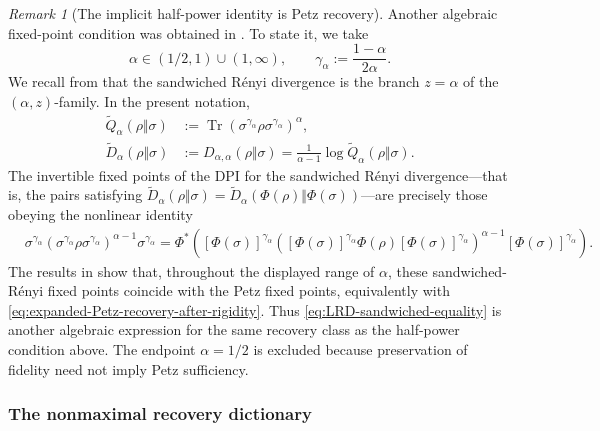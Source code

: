 \documentclass[11pt]{article}
\theoremstyle{remark}
\newtheorem{remark}[remark]{Remark}
\newcommand{\1}{\mathbbm{1}}
\begin{document}
\begin{remark}[The implicit half-power identity is Petz recovery]
Another algebraic fixed-point condition was obtained in
\cite[Theorem~1 and Eq.~(30)]{leditzky2017data}.  To state it, we take
\begin{equation}
 \alpha\in(1/2,1)\cup(1,\infty),
 \qquad
 \gamma_\alpha:=\frac{1-\alpha}{2\alpha}.
\end{equation}
We recall from  that the sandwiched
R\'enyi divergence is the branch $z=\alpha$ of the
$(\alpha,z)$-family.  In the present notation,
\begin{align}
 \widetilde Q_\alpha(\rho\Vert\sigma)
 &:=\operatorname{Tr}\!\left(
   \sigma^{\gamma_\alpha}\rho\sigma^{\gamma_\alpha}
   \right)^\alpha,
 \label{eq:sandwiched-Q-recall}\\
 \widetilde D_\alpha(\rho\Vert\sigma)
 &:=D_{\alpha,\alpha}(\rho\Vert\sigma)
 =\frac{1}{\alpha-1}
   \log\widetilde Q_\alpha(\rho\Vert\sigma).
 \label{eq:sandwiched-divergence-recall}
\end{align}
The invertible fixed points of the DPI for the sandwiched R\'enyi
divergence---that is, the pairs satisfying
$\widetilde D_\alpha(\rho\Vert\sigma)
=\widetilde D_\alpha(\Phi(\rho)\Vert\Phi(\sigma))$---are precisely
those obeying the nonlinear identity
\begin{equation}
\begin{aligned}
 &\sigma^{\gamma_\alpha}
  \left(\sigma^{\gamma_\alpha}\rho
              \sigma^{\gamma_\alpha}\right)^{\alpha-1}
  \sigma^{\gamma_\alpha}=\Phi^*\!\left(
 [\Phi(\sigma)]^{\gamma_\alpha}
 \left(
 [\Phi(\sigma)]^{\gamma_\alpha}\Phi(\rho)
 [\Phi(\sigma)]^{\gamma_\alpha}
 \right)^{\alpha-1}
 [\Phi(\sigma)]^{\gamma_\alpha}
 \right).
 \label{eq:LRD-sandwiched-equality}
\end{aligned}
\end{equation}
The results in
\cite{jencova2017preservation,jencova2021renyi} show that, throughout
the displayed range of $\alpha$, these sandwiched-R\'enyi fixed
points coincide with the Petz fixed points, equivalently with
\eqref{eq:expanded-Petz-recovery-after-rigidity}.  Thus
\eqref{eq:LRD-sandwiched-equality} is another algebraic expression for
the same recovery class as the half-power condition above.  The
endpoint $\alpha=1/2$ is excluded because preservation of fidelity
need not imply Petz sufficiency.
\end{remark}

\subsubsection{The nonmaximal recovery dictionary}
\end{document}
